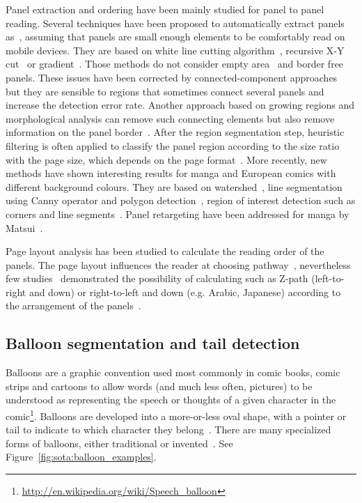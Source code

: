 Panel extraction and ordering have been mainly studied for panel to panel reading.
Several techniques have been proposed to automatically extract panels as~\cite{In11}, assuming that panels are small enough elements to be comfortably read on mobile devices.
They are based on white line cutting algorithm~\cite{Duda72,Luyuan2014Automatic,Chan2007Automatic}, recursive X-Y cut~\cite{Han07} or gradient~\cite{Tan07}.
Those methods do not consider empty area~\cite{In11} and border free panels.
These issues have been corrected by connected-component approaches~\cite{Arai10} 
but they are sensible to regions that sometimes connect several panels and increase the detection error rate.
Another approach based on growing regions and morphological analysis can remove such connecting elements but also remove information on the panel border~\cite{Ho2012}.
After the region segmentation step, heuristic filtering is often applied to classify the panel region according to the size ratio with the page size, which depends on the page format~\cite{Arai11,Ho2012}.
More recently, new methods have shown interesting results for manga and European comics with different background colours.
They are based on watershed~\cite{ponsard2012ocr}, line segmentation using Canny operator and polygon detection~\cite{Luyuan2014Automatic}, region of interest detection such as corners and line segments~\cite{stommel2012segmentation,Tsai2013Adaptive}.
Panel retargeting have been addressed for manga by Matsui~\cite{Matsui2011}.

Page layout analysis has been studied to calculate the reading order of the panels.
The page layout influences the reader at choosing pathway~\cite{Cohn_2013}, nevertheless few studies~\cite{Guerin2012Ontologies,Ponsard09,Arai2010Automatic} demonstrated the possibility of calculating such as Z-path (left-to-right and down) or right-to-left and down (e.g. Arabic, Japanese) according to the arrangement of the panels~\cite{Li2013Comic,Tsai2013Adaptive,Liu2014Automatic}. 

\subsection{Balloon segmentation and tail detection}
\label{sec:sota:balloon_segmentation}

Balloons are a graphic convention used most commonly in comic books, comic strips and cartoons to allow words (and much less often, pictures) to be understood as representing the speech or thoughts of a given character in the comic\footnote{\url{http://en.wikipedia.org/wiki/Speech_balloon}}.
Balloons are developed into a more-or-less oval shape, with a pointer or tail to indicate to which character they belong~\cite{Goggin2010Rise,Varnum2007Language}.
There are many specialized forms of balloons, either traditional or invented~\cite{Marx2006Writing}.
See Figure~\ref{fig:sota:balloon_examples}.


